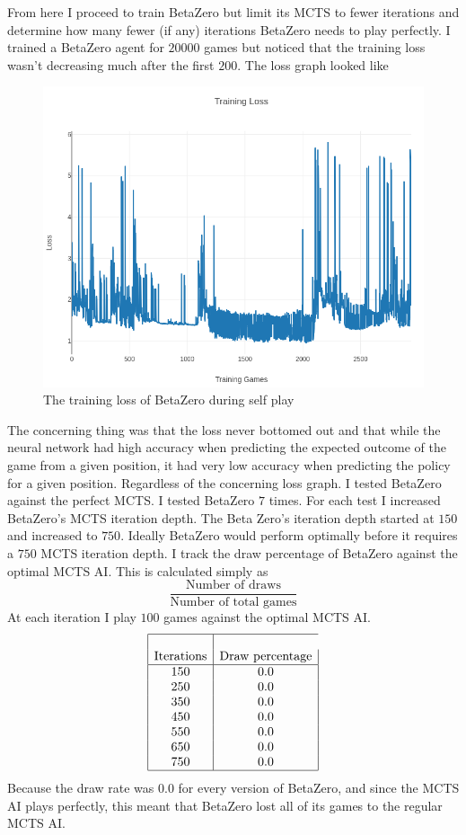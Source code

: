 \documentclass[letterpaper]{article} %
\begin{document}
  From here I proceed to train BetaZero but limit its MCTS to fewer iterations
  and determine how many fewer (if any) iterations BetaZero needs to play
  perfectly. I trained a BetaZero agent for $20000$ games but noticed that the
  training loss wasn't decreasing much after the first $200$. The loss graph
  looked like
  \begin{figure}[!htb]
    \centering
    \includegraphics[scale=0.3]{training_loss.png}
    \caption{The training loss of BetaZero during self play}
  \end{figure}
  The concerning thing was that the loss never bottomed out and that while the
  neural network had high accuracy when predicting the expected outcome of the
  game from a given position, it had very low accuracy when predicting the
  policy for a given position. Regardless of the concerning loss graph. I tested
  BetaZero against the perfect MCTS. I tested BetaZero $7$ times. For each test
  I increased BetaZero's MCTS iteration depth. The Beta Zero's iteration depth
  started at $150$ and increased to $750$. Ideally BetaZero would perform
  optimally before it requires a $750$ MCTS iteration depth. I track the draw
  percentage of BetaZero against the optimal MCTS AI. This is calculated simply
  as
  \[\frac{\text{Number of draws}}{\text{Number of total games}}\]
  At each iteration I play $100$ games against the optimal MCTS AI.
  \[\begin{array}{|c|c|}\hline \\ \text{Iterations} & \text{Draw percentage}
    \\\hline
    150 & 0.0 \\
    250 & 0.0 \\
    350 & 0.0 \\
    450 & 0.0 \\
    550 & 0.0 \\
    650 & 0.0 \\
    750 & 0.0 \\
  \hline\end{array}\]
  Because the draw rate was $0.0$ for every version of BetaZero, and since the
  MCTS AI plays perfectly, this meant that BetaZero lost all of its games to the
  regular MCTS AI.
\end{document}
